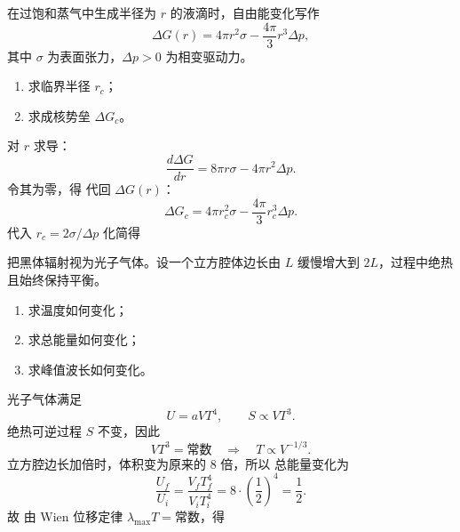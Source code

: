 \begin{question}
在过饱和蒸气中生成半径为 $r$ 的液滴时，自由能变化写作
\[
\Delta G(r)=4\pi r^2\sigma-\frac{4\pi}{3}r^3\Delta p,
\]
其中 $\sigma$ 为表面张力，$\Delta p>0$ 为相变驱动力。
\begin{enumerate}[label=(\arabic*),leftmargin=2.8em,itemsep=0.2em]
\item 求临界半径 $r_c$；
\item 求成核势垒 $\Delta G_c$。
\end{enumerate}
\begin{solution}

对 $r$ 求导：
\[
\frac{d\Delta G}{dr}=8\pi r\sigma-4\pi r^2\Delta p.
\]
令其为零，得
代回 $\Delta G(r)$：
\[
\Delta G_c=4\pi r_c^2\sigma-\frac{4\pi}{3}r_c^3\Delta p.
\]
代入 $r_c=2\sigma/\Delta p$ 化简得
\end{solution}
\end{question}

\begin{question}
把黑体辐射视为光子气体。设一个立方腔体边长由 $L$ 缓慢增大到 $2L$，过程中绝热且始终保持平衡。
\begin{enumerate}[label=(\arabic*),leftmargin=2.8em,itemsep=0.2em]
\item 求温度如何变化；
\item 求总能量如何变化；
\item 求峰值波长如何变化。
\end{enumerate}
\begin{solution}

光子气体满足
\[
U=aVT^4,
\qquad S\propto VT^3.
\]
绝热可逆过程 $S$ 不变，因此
\[
VT^3=\text{常数}
\quad\Longrightarrow\quad
T\propto V^{-1/3}.
\]
立方腔边长加倍时，体积变为原来的 $8$ 倍，所以
总能量变化为
\[
\frac{U_f}{U_i}=\frac{V_fT_f^4}{V_iT_i^4}=8\cdot\left(\frac12\right)^4=\frac12.
\]
故
由 Wien 位移定律 $\lambda_{\max}T=\text{常数}$，得
\end{solution}
\end{question}

